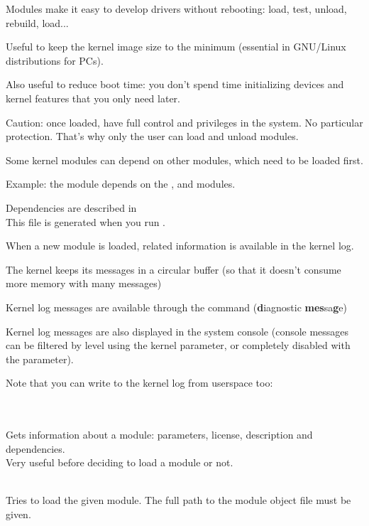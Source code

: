 
  \startitemize
  \item Modules make it easy to develop drivers without rebooting:
    load, test, unload, rebuild, load...
  \item Useful to keep the kernel image size to the minimum (essential
    in GNU/Linux distributions for PCs).
  \item Also useful to reduce boot time: you don't spend time
    initializing devices and kernel features that you only need later.
  \item Caution: once loaded, have full control and privileges in the
    system. No particular protection. That's why only the  user
    can load and unload modules.
  \stopitemize

  \startitemize
  \item Some kernel modules can depend on other modules,
    which need to be loaded first.
  \item Example: the  module depends on the
    ,  and  modules.
  \item Dependencies are described
    in \\
    This file is generated when you run .
  \stopitemize


  When a new module is loaded, related information is available in the
  kernel log.
  \startitemize
  \item The kernel keeps its messages in a circular buffer (so that it
    doesn't consume more memory with many messages)
  \item Kernel log messages are available through the 
    command ({\bf d}iagnostic {\bf mes}sa{\bf g}e)
  \item Kernel log messages are also displayed in the system console
    (console messages can be filtered by level using the
     kernel parameter, or completely disabled with the
     parameter).
  \item Note that you can write to the kernel log from userspace too:\\
  \stopitemize

  \startitemize
  \item {}\\
    \\
    Gets information about a module: parameters, license, description
    and dependencies.\\
    Very useful before deciding to load a module or not.
  \item {}\\
    Tries to load the given module. The full path to the module object
    file must be given.
  \stopitemize

